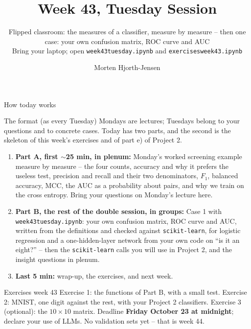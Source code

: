 \documentclass[10pt,aspectratio=169]{beamer}
\title{Week 43, Tuesday Session}
\subtitle{Flipped classroom: the measures of a classifier, measure by
  measure -- then one case: your own confusion matrix, ROC curve and AUC\\[3pt]
  \small Bring your laptop; open \texttt{week43tuesday.ipynb} and
  \texttt{exercisesweek43.ipynb}}
\author{Morten Hjorth-Jensen}
\institute{Department of Physics and Center for Computing in Science Education,\\
  University of Oslo, Norway}
\date{}
\newcounter{insight}
\newcounter{case}
\begin{document}
\begin{frame}
\titlepage
\end{frame}

\begin{frame}{How today works}
\small
\begin{block}{The format (as every Tuesday)}
Mondays are lectures; Tuesdays belong to your questions and to concrete
cases.  Today has two parts, and the second is the skeleton of this week's
exercises and of part e) of Project 2.
\end{block}
\begin{enumerate}
  \item \textbf{Part A, first $\sim$25 min, in plenum:} Monday's worked
        screening example measure by measure -- the four counts, accuracy
        and why it prefers the useless test, precision and recall and their
        two denominators, $F_1$, balanced accuracy, MCC, the AUC as a
        probability about pairs, and why we train on the cross entropy.
        Bring your questions on Monday's lecture here.
  \item \textbf{Part B, the rest of the double session, in groups:} Case 1
        with \texttt{week43tuesday.ipynb}: your own confusion matrix, ROC
        curve and AUC, written from the definitions and checked against
        \texttt{scikit-learn}, for logistic regression and a one-hidden-layer
        network from your own code on ``is it an eight?'' -- then the
        \texttt{scikit-learn} calls you will use in Project 2, and the
        insight questions in plenum.
  \item \textbf{Last 5 min:} wrap-up, the exercises, and next week.
\end{enumerate}
\begin{block}{Exercises week 43}
Exercise 1: the functions of Part B, with a small test.  Exercise 2: MNIST,
one digit against the rest, with your Project 2 classifiers.  Exercise 3
(optional): the $10\times10$ matrix.  Deadline \textbf{Friday October 23 at
midnight}; declare your use of LLMs.  No validation sets yet -- that is
week 44.
\end{block}
\end{frame}

\end{document}
